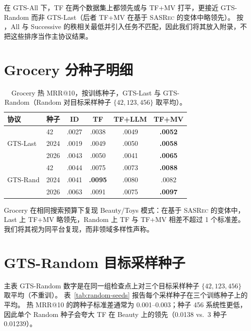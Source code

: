 \documentclass[sigconf,natbib=true,anonymous]{acmart}
\newcommand{\tfmv}{\textsc{TF+MV}\xspace}
\newcommand{\base}{\textsc{SASRec}\xspace}
\begin{document}
在 GTS-All 下，TF 在两个数据集上都领先或与 \tfmv 打平，更接近 GTS-Random 而非 GTS-Last（后者 \tfmv 在基于 \base 的变体中略领先）。
按 \citet{gusak2025time}，All 与 Successive 的秩相关最低并引入任务不匹配，因此我们将其放入附录，不把这些排序当作主协议结果。

\section{Grocery 分种子明细}
\label{app:grocery}

\begin{table}[h]
\centering
\caption{Grocery 热 MRR@10，按训练种子，GTS-Last 与 GTS-Random（Random 对目标采样种子 $\{42,123,456\}$ 取平均）。}
\label{tab:grocery-perseed}
\small
\setlength{\tabcolsep}{3pt}
\begin{tabular}{@{}llcccc@{}}
\toprule
协议 & 种子 & ID & TF & TF+LLM & TF+MV \\
\midrule
\multirow{3}{*}{GTS-Last}
 & 42    & .0027 & .0038 & .0049 & \textbf{.0052} \\
 & 2024  & .0019 & .0049 & .0050 & \textbf{.0058} \\
 & 2026  & .0043 & .0050 & .0041 & \textbf{.0065} \\
\midrule
\multirow{3}{*}{GTS-Rand}
 & 42    & .0044 & .0075 & .0073 & \textbf{.0088} \\
 & 2024  & .0041 & \textbf{.0095} & .0080 & .0082 \\
 & 2026  & .0063 & .0091 & .0075 & \textbf{.0097} \\
\bottomrule
\end{tabular}
\end{table}

Grocery 在相同搜索预算下复现 Beauty/Toys 模式：在基于 \base 的变体中，Last 上 \tfmv 略领先，Random 上 TF 与 \tfmv 相差不超过 1 个标准差。
我们将其视为同平台复现，而非领域多样性声称。

\section{GTS-Random 目标采样种子}
\label{app:random-seeds}

主表 GTS-Random 数字是在同一组检查点上对三个目标采样种子 $\{42,123,456\}$ 取平均（不重训）。
表~\ref{tab:random-seeds} 报告每个采样种子在三个训练种子上的平均。
热 MRR@10 的跨种子标准差通常为 0.001--0.003；种子 456 系统性更低，因此单个 Random 种子会夸大 TF 在 Beauty 上的领先（0.0138 vs.\ 3 种子 0.01239）。
\end{document}
